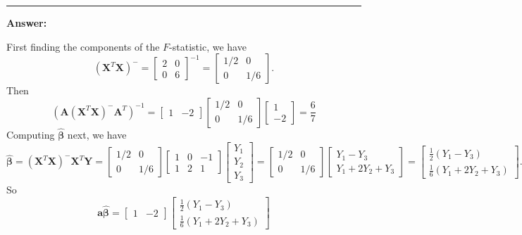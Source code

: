 \documentclass[
]{article}
\newcommand{\bmA}{\ensuremath{\bm A}}
\newcommand{\bma}{\ensuremath{\bm a}}
\newcommand{\bmX}{\ensuremath{\bm X}}
\newcommand{\bmY}{\ensuremath{\bm Y}}
\newcommand{\bmbeta}{\ensuremath{\bm{\beta}}}
\newcommand{\bbh}{\ensuremath{\hat{\bmbeta}}}
\begin{document}
\begin{center}\rule{0.5\linewidth}{0.5pt}\end{center}

\textbf{Answer:}

First finding the components of the \(F\)-statistic, we have \[
(\bmX^T\bmX)^- = \begin{bmatrix} 2 & 0 \\ 0 & 6 \end{bmatrix}^{-1} = \begin{bmatrix} 1/2 & 0 \\ 0 & 1/6 \end{bmatrix}.
\] Then \[
\left(\bmA(\bmX^T\bmX)^- \bmA^T \right)^{-1} = \begin{bmatrix} 1 & -2 \end{bmatrix} \begin{bmatrix} 1/2 & 0 \\ 0 & 1/6 \end{bmatrix} \begin{bmatrix} 1 \\ -2 \end{bmatrix} = \frac{6}{7}
\] Computing \(\bbh\) next, we have \[
\bbh = (\bmX^T\bmX)^-\bmX^T\bmY = \begin{bmatrix} 1/2 & 0 \\ 0 & 1/6 \end{bmatrix} 
\begin{bmatrix} 1 & 0 & -1 \\ 1& 2 & 1\end{bmatrix}
\begin{bmatrix} Y_1 \\ Y_2 \\ Y_3\end{bmatrix}
= \begin{bmatrix} 1/2 & 0 \\ 0 & 1/6 \end{bmatrix} 
\begin{bmatrix} Y_1 - Y_3 \\ Y_1 + 2Y_2 + Y_3 \end{bmatrix}
= \begin{bmatrix} \frac{1}{2}(Y_1 - Y_3) \\ \frac{1}{6}(Y_1 + 2Y_2 + Y_3) \end{bmatrix}.
\] So \[
\bma\bbh = \begin{bmatrix} 1 & -2 \end{bmatrix}\begin{bmatrix} \frac{1}{2}(Y_1 - Y_3) \\ \frac{1}{6}(Y_1 + 2Y_2 + Y_3) \end{bmatrix} 
\]
\end{document}
